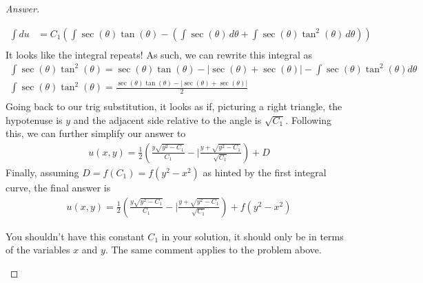\documentclass{article}
\theoremstyle{definition}
\renewcommand\qedsymbol{$\blacksquare$}
\newenvironment{ans}{\begin{proof}[Answer]\renewcommand{\qedsymbol}{}}{\end{proof}}
\begin{document}
\begin{ans}
\begin{enumerate}[resume*=answers]
\begin{align*}
                \int du &= C_1\left( \int \sec{(\theta)}\tan{(\theta)} - \left( \int \sec{(\theta)}\,d\theta + \int \sec{(\theta)}\tan^2{(\theta)}\,d\theta\right) \right)\\
            \end{align*}
            It looks like the integral repeats! As such, we can rewrite this integral as
            \begin{align*}
                \int \sec{(\theta)}\tan^2{(\theta)} = \sec{(\theta)}\tan{(\theta)} - |\sec{(\theta)} + \sec{(\theta)}| - \int \sec{(\theta)}\tan^2{(\theta)} d\theta\\
                \int \sec{(\theta)}\tan^2{(\theta)} = \frac{\sec{(\theta)}\tan{(\theta)} - |\sec{(\theta)} + \sec{(\theta)}|}{2}\\
            \end{align*}
            Going back to our trig substitution, it looks as if, picturing a right triangle, the hypotenuse is $y$ and the adjacent side relative to the angle is $\sqrt{C_1}$. Following this, we can further simplify our answer to
            \begin{align*}
                u(x, y) = \frac{1}{2}\left( \frac{y\sqrt{y^2-C_1}}{C_1} - |\frac{y+\sqrt{y^2-C_1}}{\sqrt{C_1}} \right) + D
            \end{align*}
            Finally, assuming $D = f(C_1) = f(y^2 - x^2)$ as hinted by the first integral curve, the final answer is
            \begin{align*}
                \boxed{u(x, y) = \frac{1}{2}\left( \frac{y\sqrt{y^2-C_1}}{C_1} - |\frac{y+\sqrt{y^2-C_1}}{\sqrt{C_1}} \right) + f(y^2-x^2)}
            \end{align*}

{\color{red} You shouldn't have this constant $C_{1}$ in your solution, it should only be in terms of the variables $x$ and $y$. The same comment applies to the problem above. }
			\end{enumerate}
		\end{ans}
		
	
\end{document}
